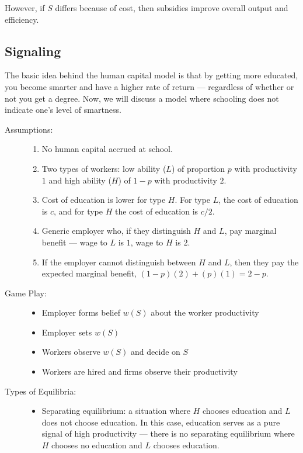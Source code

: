 \documentclass[10pt]{extarticle}
\begin{document}
  However, if $S$ differs because of cost, then subsidies improve overall output and efficiency.
  \subsection{Signaling}%
  The basic idea behind the human capital model is that by getting more educated, you become smarter and have a higher rate of return --- regardless of whether or not you get a degree. Now, we will discuss a model where schooling does not indicate one's level of smartness.
  \begin{description}
    \item[Assumptions:]\hfill
      \begin{enumerate}[(1)]
        \item No human capital accrued at school.
        \item Two types of workers: low ability ($L$) of proportion $p$ with productivity $1$ and high ability ($H$) of $1-p$ with productivity $2$.
        \item Cost of education is lower for type $H$. For type $L$, the cost of education is $c$, and for type $H$ the cost of education is $c/2$.
        \item Generic employer who, if they distinguish $H$ and $L$, pay marginal benefit --- wage to $L$ is $1$, wage to $H$ is $2$.
        \item If the employer cannot distinguish between $H$ and $L$, then they pay the expected marginal benefit, $(1-p)(2) + (p)(1) = 2-p$.
      \end{enumerate}
    \item[Game Play:] \hfill
      \begin{itemize}
        \item Employer forms belief $w(S)$ about the worker productivity
        \item Employer sets $w(S)$
        \item Workers observe $w(S)$ and decide on $S$
        \item Workers are hired and firms observe their productivity
      \end{itemize}
    \item[Types of Equilibria:]\hfill
      \begin{itemize}
        \item Separating equilibrium: a situation where $H$ chooses education and $L$ does not choose education. In this case, education serves as a pure signal of high productivity --- there is no separating equilibrium where $H$ chooses no education and $L$ chooses education.

\end{itemize}
\end{description}
\end{document}
